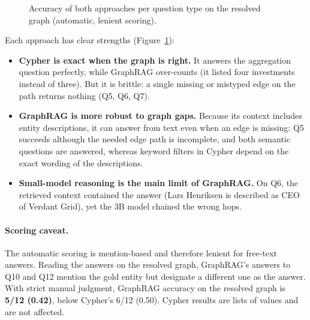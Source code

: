\documentclass[11pt,a4paper]{report}
\begin{document}
\begin{figure}[ht]
\centering
{}
\caption{Accuracy of both approaches per question type on the resolved graph (automatic, lenient scoring).}
\label{fig:rq3}
\end{figure}

Each approach has clear strengths (Figure~\ref{fig:rq3}):
\begin{itemize}
  \item \textbf{Cypher is exact when the graph is right.} It answers the aggregation question perfectly, while
        GraphRAG over-counts (it listed four investments instead of three). But it is brittle: a single missing or
        mistyped edge on the path returns nothing (Q5, Q6, Q7).
  \item \textbf{GraphRAG is more robust to graph gaps.} Because its context includes entity descriptions, it can
        answer from text even when an edge is missing: Q5 succeeds although the needed edge path is incomplete, and
        both semantic questions are answered, whereas keyword filters in Cypher depend on the exact wording of the
        descriptions.
  \item \textbf{Small-model reasoning is the main limit of GraphRAG.} On Q6, the retrieved context contained the
        answer (Lars Henriksen is described as CEO of Verdant Grid), yet the 3B model chained the wrong hops.
\end{itemize}

\paragraph{Scoring caveat.} The automatic scoring is mention-based and therefore lenient for free-text answers.
Reading the answers on the resolved graph, GraphRAG's answers to Q10 and Q12 mention the gold entity but designate a
different one as the answer. With strict manual judgment, GraphRAG accuracy on the resolved graph is \textbf{5/12
(0.42)}, below Cypher's 6/12 (0.50). Cypher results are lists of values and are not affected.
\end{document}
